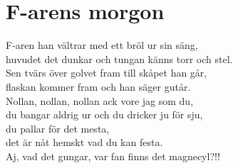 \section{F-arens morgon}
F-aren han vältrar med ett bröl ur sin säng,\\
huvudet det dunkar och tungan känns torr och stel.\\
Sen tvärs över golvet fram till skåpet han går,\\
flaskan kommer fram och han säger gutår.\\

Nollan, nollan, nollan ack vore jag som du,\\
du bangar aldrig ur och du dricker ju för sju,\\
du pallar för det mesta,\\
det är nåt hemskt vad du kan festa.\\
Aj, vad det gungar, var fan finns det magnecyl?!!\\